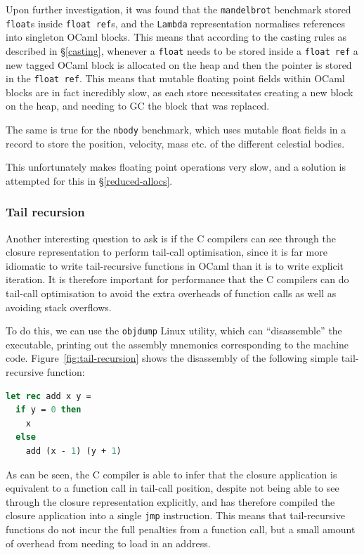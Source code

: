 Upon further investigation, it was found that the \texttt{mandelbrot} benchmark
stored \texttt{float}s inside \texttt{float ref}s, and the \texttt{Lambda}
representation normalises references into singleton OCaml blocks. This means
that according to the casting rules as described in \S\ref{casting}, whenever a
\texttt{float} needs to be stored inside a \texttt{float ref} a new tagged OCaml
block is allocated on the heap and then the pointer is stored in the
\texttt{float ref}. This means that mutable floating point fields within OCaml
blocks are in fact incredibly slow, as each store necessitates creating a new
block on the heap, and needing to GC the block that was replaced.

The same is true for the \texttt{nbody} benchmark, which uses mutable float 
fields in a record to store the position, velocity, mass etc. of the different 
celestial bodies.

This unfortunately makes floating point operations very slow, and a solution is
attempted for this in \S\ref{reduced-allocs}.

\subsubsection{Tail recursion} \label{tail-recursion}

Another interesting question to ask is if the C compilers can see through the 
closure representation to perform tail-call optimisation, since it is far more 
idiomatic to write tail-recursive functions in OCaml than it is to write 
explicit iteration. It is therefore important for performance that the C 
compilers can do tail-call optimisation to avoid the extra overheads of 
function calls as well as avoiding stack overflows.

To do this, we can use the \texttt{objdump} Linux utility, which can 
``disassemble'' the executable, printing out the assembly mnemonics 
corresponding to the machine code.  Figure~\ref{fig:tail-recursion} shows the 
disassembly of the following simple tail-recursive function:

\begin{lstlisting}[language=Caml]
let rec add x y =
  if y = 0 then
    x
  else
    add (x - 1) (y + 1)
\end{lstlisting}

As can be seen, the C compiler is able to infer that the closure application is 
equivalent to a function call in tail-call position, despite not being able to 
see through the closure representation explicitly, and has therefore compiled 
the closure application into a single \texttt{jmp} instruction. This means that 
tail-recursive functions do not incur the full penalties from a function call, 
but a small amount of overhead from needing to load in an address.

